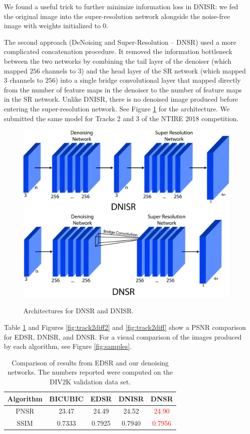 \documentclass[10pt,twocolumn,letterpaper]{article}
\begin{document}
We found a useful trick to further minimize information loss in DNISR: we fed the original image into the super-resolution network alongside the noise-free image with weights initialized to $0$. 

The second approach (DeNoising and Super-Resolution -- DNSR) used a more complicated concatenation procedure. It removed the information bottleneck between the two networks by combining the tail layer of the denoiser (which mapped $256$ channels to $3$) and the head layer of the SR network (which mapped $3$ channels to $256$) into a single bridge convolutional layer that mapped directly from the number of feature maps in the denoiser to the number of feature maps in the SR network. Unlike DNISR, there is no denoised image produced before entering the super-resolution network. See Figure \ref{fig:dnsr} for the architecture. We submitted the same model for Tracks 2 and 3 of the NTIRE 2018 competition.

\begin{figure}[htbp]
\centering
\includegraphics[width=\columnwidth]{Images/DNSR.png}\\
\caption{Architectures for DNSR and DNISR.}
\label{fig:dnsr}
\end{figure}

Table \ref{tbl:dnsr} and Figures \ref{fig:track2diff2} and \ref{fig:track2diff} show a PSNR comparison for EDSR, DNISR, and DNSR. For a visual comparison of the images produced by each algorithm, see Figure \ref{fig:samples}.
\begin{table}[htbp]
    \centering
    \begin{tabular}{c|c|c|c|c}
       Algorithm & BICUBIC & EDSR & DNISR & DNSR \\\hline
       PNSR & 23.47 & 24.49 & 24.52 & \textcolor{red}{24.90} \\
       SSIM & 0.7333 & 0.7925 & 0.7940& \textcolor{red}{0.7956}
    \end{tabular}
    \caption{Comparison of results from EDSR and our denoising networks. The numbers reported were computed on the DIV2K \cite{Agustsson_2017_CVPR_Workshops} validation data set.}
    \label{tbl:dnsr}
\end{table}
\end{document}
